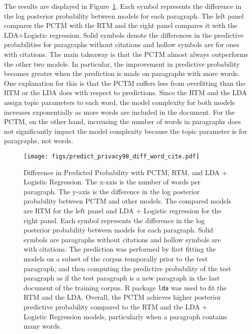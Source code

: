 The results are displayed in Figure~\ref{pred_privacy_realdata}.
Each symbol represents the difference in the log posterior probability between models for each paragraph. 
The left panel compares the PCTM with the RTM and the right panel compares it with the LDA+Logistic regression.
Solid symbols denote the differences in the predictive probabilities for paragraphs without citations and hollow symbols are for ones with citations.
The main takeaway is that the PCTM almost always outperforms the other two models.
In particular, the improvement in predictive probability becomes greater when the prediction is made on paragraphs with more words. 
One explanation for this is that the PCTM suffers less from overfitting than the RTM or the LDA does with respect to predictions.
Since the RTM and the LDA assign topic parameters to each word, the model complexity for both models increases exponentially as more words are included in the document.
For the PCTM, on the other hand, increasing the number of words in paragraphs does not significantly impact the model complexity because the topic parameter is for paragraphs, not words. 

\begin{figure}
  \texttt{[image: figs/predict\_privacy98\_diff\_word\_cite.pdf]}
  \caption{Difference in Predicted Probability with PCTM, RTM, and LDA + Logistic Regression. 
  The x-axis is the number of words per paragraph.
  The y-axis is the difference in the log posterior probability between PCTM and other models.
  The compared models are RTM for the left panel and LDA + Logistic regression for the right panel.
  Each symbol represents the difference in the log posterior probability between models for each paragraph. 
  Solid symbols are paragraphs without citations and hollow symbols are with citations.
  The prediction was performed by first fitting the models on a subset of the corpus temporally prior to the test paragraph, and then computing the predictive probability of the test paragraph as if the test paragraph is a new paragraph in the last document of the training corpus.  
  R package \texttt{lda} was used to fit the RTM and the LDA.
  Overall, the PCTM achieves higher posterior predictive probability compared to the RTM and the LDA + Logistic Regression models, particularly when a paragraph contains many words. 
  }
  \label{pred_privacy_realdata} 
\end{figure}

